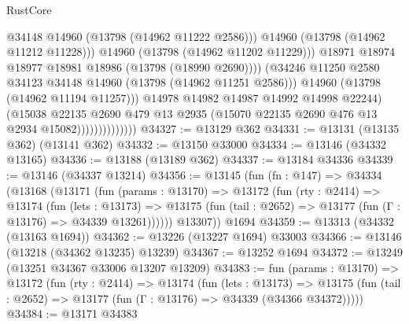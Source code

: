 \begin{lexlean}{RustCore}
\begin{coremodule}
                                          @34148
                                          @14960
                                          (@13798 (@14962 @11222 @2586)))
                                        @14960
                                        (@13798 (@14962 @11212 @11228)))
                                      @14960
                                      (@13798 (@14962 @11202 @11229)))
                                    @18971
                                    @18974
                                    @18977
                                    @18981
                                    @18986
                                    (@13798 (@18990 @2690))))
                                (@34246
                                  @11250
                                  @2580
                                  @34123
                                  @34148
                                  @14960
                                  (@13798 (@14962 @11251 @2586)))
                                @14960
                                (@13798 (@14962 @11194 @11257)))
                              @14978
                              @14982
                              @14987
                              @14992
                              @14998
                              @22244)
                            (@15038
                              @22135
                              @2690
                              @479
                              @13
                              @2935
                              (@15070 @22135 @2690 @476 @13 @2934 @15082))))))))))))))
@34327 := @13129 @362
@34331 := @13131 (@13135 @362) (@13141 @362)
@34332 := @13150 @33000
@34334 := @13146 (@34332 @13165)
@34336 := @13188 (@13189 @362)
@34337 := @13184 @34336
@34339 := @13146 (@34337 @13214)
@34356 := @13145
    (fun (fn : @147) =>
    @34334
      (@13168
        (@13171
          (fun (params : @13170) =>
          @13172
            (fun (rty : @2414) =>
            @13174
              (fun (lets : @13173) =>
              @13175 (fun (tail : @2652) => @13177 (fun (Γ : @13176) => @34339 @13261))))))
        @13307))
    @1694
@34359 := @13313 (@34332 (@13163 @1694))
@34362 := @13226 (@13227 @1694) @33003
@34366 := @13146 (@13218 (@34362 @13235) @13239)
@34367 := @13252 @1694
@34372 := @13249 (@13251 @34367 @33006 @13207 @13209)
@34383 := fun (params : @13170) =>
  @13172
    (fun (rty : @2414) =>
    @13174
      (fun (lets : @13173) =>
      @13175 (fun (tail : @2652) => @13177 (fun (Γ : @13176) => @34339 (@34366 @34372)))))
@34384 := @13171 @34383

\end{coremodule}
\end{lexlean}
